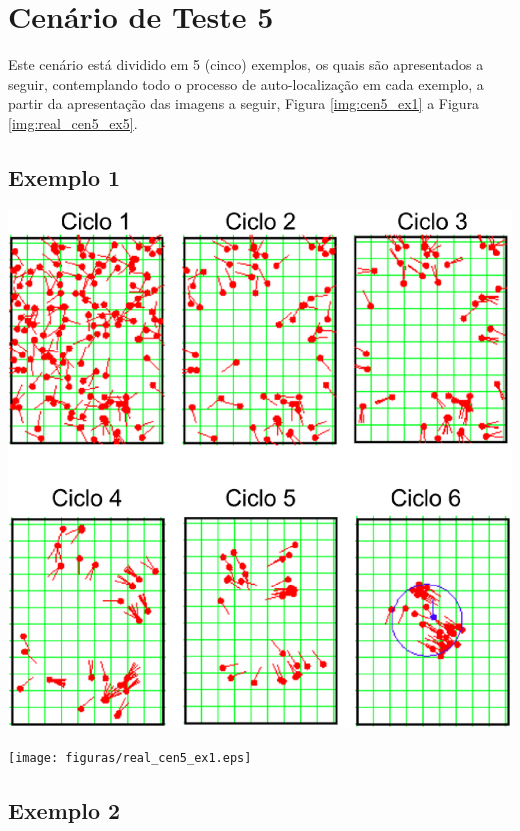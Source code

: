 \section{Cenário de Teste 5}

Este cenário está dividido em 5 (cinco) exemplos, os quais são apresentados a seguir, contemplando todo o processo de auto-localização
em cada exemplo, a partir da apresentação das imagens a seguir, Figura \ref{img:cen5_ex1} a Figura \ref{img:real_cen5_ex5}.

\subsection{Exemplo 1}

{\centering
\includegraphics[scale=0.4]{figuras/cen5_ex1.eps}
\label{img:cen5_ex1}
\par}

{\centering
\texttt{[image: figuras/real\_cen5\_ex1.eps]}
\label{img:real_cen5_ex1}
\par}

\subsection{Exemplo 2}

